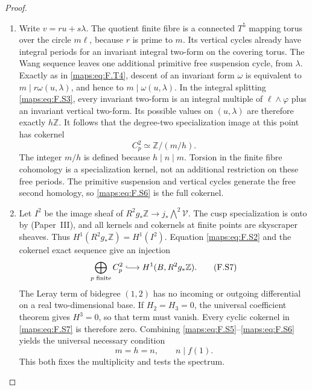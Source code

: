 \documentclass[11pt,a4paper]{article}
\theoremstyle{definition}
\newcommand{\ExternalPaperRef}[3]{\ifmmode\text{\upshape #1#2 (Paper~#3)}\else #1#2 (Paper~#3)\fi}
\begin{document}
\begin{proof}
\begin{enumerate}[label=\arabic*.]
\item Write $v=ru+s\lambda$.  The quotient finite fibre is a
connected $T^5$ mapping torus over the circle $m\ell$,
because $r$ is prime to $m$.
Its vertical cycles already have integral periods for an
invariant integral two-form on the covering torus.
The Wang sequence leaves one additional primitive free
suspension cycle, from $\lambda$.
Exactly as in \eqref{maps:eq:F.T4}, descent of an invariant form $\omega$
is equivalent to
$m\mid r\omega(u,\lambda)$, and hence to
$m\mid\omega(u,\lambda)$.
In the integral splitting \eqref{maps:eq:F.S3}, every invariant two-form
is an integral multiple of $\ell\wedge\varphi$ plus an
invariant vertical two-form.  Its possible values on
$(u,\lambda)$ are therefore exactly $h\mathbb Z$.
It follows that the degree-two specialization image at
this point has cokernel
\[
 C^2_p\simeq\mathbb Z/(m/h).
 \tag{F.S6}\label{maps:eq:F.S6}
\]
The integer $m/h$ is defined because $h\mid n\mid m$.
Torsion in the finite fibre cohomology is a specialization
kernel, not an additional restriction on these free periods.
The primitive suspension and vertical cycles generate the
free second homology, so \eqref{maps:eq:F.S6} is the full cokernel.

\item Let $I^2$ be the image sheaf of
$R^2g_*\mathbb Z\to j_*\bigwedge^2\mathcal V$.
The cusp specialization is onto by \ExternalPaperRef{}{6.3}{III}, and all kernels
and cokernels at finite points are skyscraper sheaves.
Thus $H^1(R^2g_*\mathbb Z)=H^1(I^2)$.
Equation \eqref{maps:eq:F.S2} and the cokernel exact sequence give an
injection
\[
 \bigoplus_{p\text{ finite}}C^2_p
           \lhook\joinrel\longrightarrow H^1(B,R^2g_*\mathbb Z).
 \tag{F.S7}\label{maps:eq:F.S7}
\]
The Leray term of bidegree $(1,2)$ has no incoming or
outgoing differential on a real two-dimensional base.
If $H_2=H_3=0$, the universal coefficient theorem gives
$H^3=0$, so that term must vanish.
Every cyclic cokernel in \eqref{maps:eq:F.S7} is therefore zero.
Combining \eqref{maps:eq:F.S5}--\eqref{maps:eq:F.S6} yields the universal necessary
condition
\[
 m=h=n,\qquad n\mid f(1).
 \tag{F.S8}\label{maps:eq:F.S8}
\]
This both fixes the multiplicity and tests the spectrum.


\end{enumerate}
\end{proof}
\end{document}
